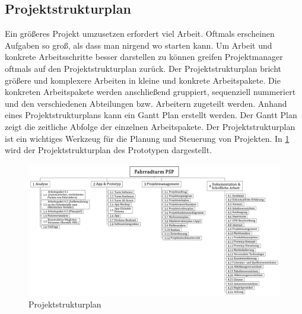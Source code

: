 \subsection{Projektstrukturplan}

Ein größeres Projekt umzusetzen erfordert viel Arbeit. Oftmals erscheinen Aufgaben so groß, als dass man nirgend wo starten kann. Um Arbeit und konkrete Arbeitsschritte besser darstellen zu können greifen Projektmanager oftmals auf den Projektstrukturplan zurück. Der Projektstrukturplan bricht größere und komplexere Arbeiten in kleine und konkrete Arbeitspakete. Die konkreten Arbeitspakete werden anschließend gruppiert, sequenziell nummeriert und den verschiedenen Abteilungen bzw. Arbeitern zugeteilt werden. Anhand eines Projektstrukturplans kann ein Gantt Plan erstellt werden. Der Gantt Plan zeigt die zeitliche Abfolge der einzelnen Arbeitspakete. Der Projektstrukturplan ist ein wichtiges Werkzeug für die Planung und Steuerung von Projekten. In \ref{fig:projektstrukturplan} wird der Projektstrukturplan des Prototypen dargestellt.

\begin{figure}[H]
  \centering
  \includegraphics[width=1\textwidth]{images/projektstrukturplan}
  \caption{Projektstrukturplan}
  \label{fig:projektstrukturplan}
\end{figure}
